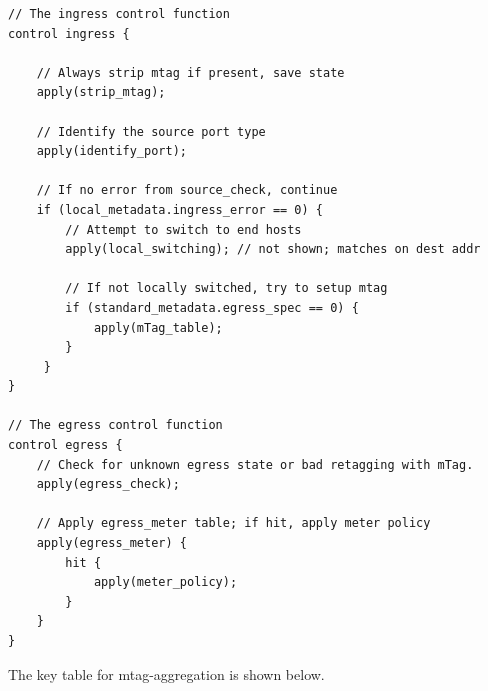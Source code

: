 \documentclass[12pt]{article}
\begin{document}
\begin{lstlisting}[keywords={},frame=single,escapechar=\@]
// The ingress control function
control ingress {

    // Always strip mtag if present, save state
    apply(strip_mtag);

    // Identify the source port type
    apply(identify_port);

    // If no error from source_check, continue
    if (local_metadata.ingress_error == 0) {
        // Attempt to switch to end hosts
        apply(local_switching); // not shown; matches on dest addr

        // If not locally switched, try to setup mtag
        if (standard_metadata.egress_spec == 0) {
            apply(mTag_table);
        }
     }
}

// The egress control function
control egress {
    // Check for unknown egress state or bad retagging with mTag.
    apply(egress_check);

    // Apply egress_meter table; if hit, apply meter policy
    apply(egress_meter) {
        hit {
            apply(meter_policy);
        }
    }
}
\end{lstlisting}

The key table for mtag-aggregation is shown below.
\end{document}
